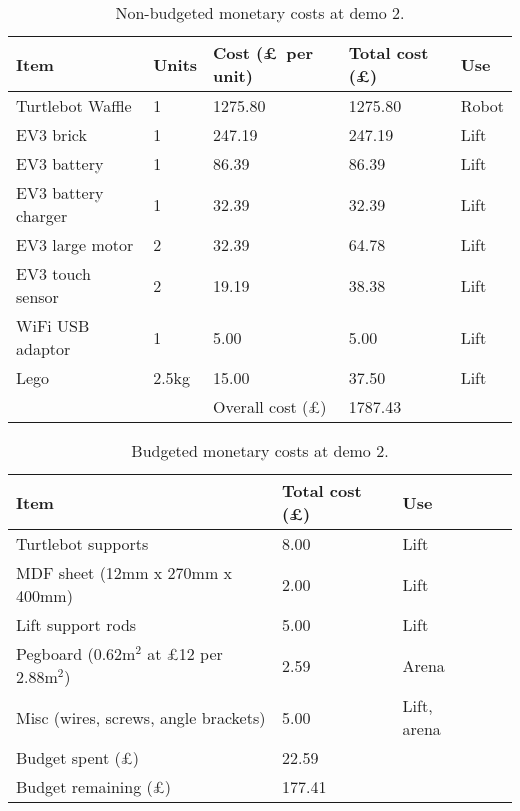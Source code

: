\documentclass{article}
\begin{document}
\begin{table*}[h]
\vskip 3mm
\begin{center}
\begin{small}
\begin{sc}
  \begin{tabular}{lllll}
    {\bf Item} & {\bf Units} & {\bf Cost (\pounds\ per unit)} & {\bf Total cost (\pounds)} & {\bf Use} \\
    \hline
    Turtlebot Waffle & 1 & 1275.80 & 1275.80 & Robot \\
    EV3 brick & 1 & 247.19 & 247.19 & Lift \\
    EV3 battery & 1 & 86.39 & 86.39 & Lift \\
    EV3 battery charger & 1 & 32.39 & 32.39 & Lift \\
    EV3 large motor & 2 & 32.39 & 64.78 & Lift \\
    EV3 touch sensor & 2 & 19.19 & 38.38 & Lift \\
    WiFi USB adaptor & 1 & 5.00 & 5.00 & Lift \\
    Lego & 2.5kg & 15.00 & 37.50 & Lift \\
    \hline \hline
         &       & Overall cost (\pounds) & 1787.43
  \end{tabular}
\end{sc}
\end{small}
\caption{Non-budgeted monetary costs at demo 2.}
\label{tab:non-budget-cost}
\end{center}
\vskip -3mm
\end{table*}

\begin{table*}[h]
\vskip 3mm
\begin{center}
\begin{small}
\begin{sc}
  \begin{tabular}{lllll}
    {\bf Item} & {\bf Total cost (\pounds)} & {\bf Use} \\
    \hline
    Turtlebot supports  & 8.00 & Lift \\
    MDF sheet (12mm x 270mm x 400mm) & 2.00 & Lift \\
    Lift support rods & 5.00 & Lift \\
    Pegboard ($0.62 \text{m}^2$ at \pounds 12 per $2.88 \text{m}^2$)& 2.59 & Arena \\
    Misc (wires, screws, angle brackets) & 5.00 & Lift, arena \\
    \hline
    \hline
     Budget spent (\pounds) & 22.59 \\
     Budget remaining (\pounds) & 177.41   
  \end{tabular}
\end{sc}
\end{small}
\caption{Budgeted monetary costs at demo 2.}
\label{tab:budget-cost-monetary}
\end{center}
\vskip -3mm
\end{table*}
\end{document}
